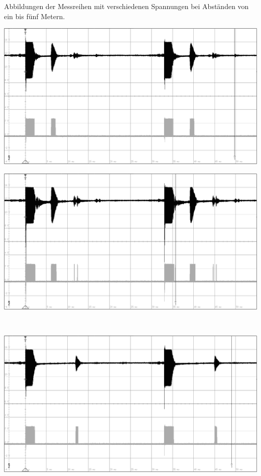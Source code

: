 Abbildungen der Messreihen mit verschiedenen Spannungen bei Abständen von ein bis fünf Metern.
\begin{minipage}{0.46\textwidth}
\includegraphics[width=1\textwidth%
]{Abbildungen/MessungenP2/5V/1m.PNG}
\end{minipage}\qquad
\begin{minipage}{0.46\textwidth}
\includegraphics[width=1\textwidth%
]{Abbildungen/MessungenP2/10V/1m.PNG}
\end{minipage}\\
\begin{minipage}{0.46\textwidth}
\includegraphics[width=1\textwidth%
]{Abbildungen/MessungenP2/5V/2m.PNG}
\end{minipage}\qquad
